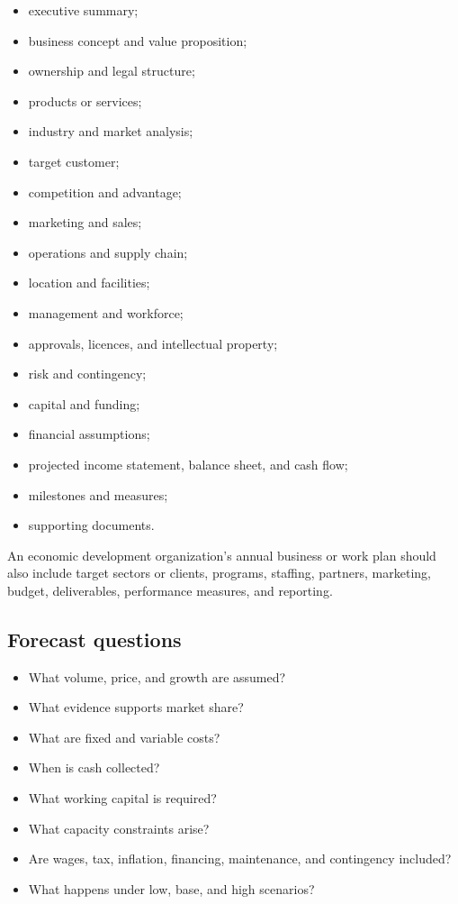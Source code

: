 \documentclass[11pt,letterpaper,oneside,openany]{book}
\begin{document}
\begin{itemize}
\item executive summary;
\item business concept and value proposition;
\item ownership and legal structure;
\item products or services;
\item industry and market analysis;
\item target customer;
\item competition and advantage;
\item marketing and sales;
\item operations and supply chain;
\item location and facilities;
\item management and workforce;
\item approvals, licences, and intellectual property;
\item risk and contingency;
\item capital and funding;
\item financial assumptions;
\item projected income statement, balance sheet, and cash flow;
\item milestones and measures;
\item supporting documents.
\end{itemize}


An economic development organization's annual business or work plan should also include target sectors or clients, programs, staffing, partners, marketing, budget, deliverables, performance measures, and reporting.


\subsection[Forecast questions]{Forecast questions}
\begin{itemize}
\item What volume, price, and growth are assumed?
\item What evidence supports market share?
\item What are fixed and variable costs?
\item When is cash collected?
\item What working capital is required?
\item What capacity constraints arise?
\item Are wages, tax, inflation, financing, maintenance, and contingency included?
\item What happens under low, base, and high scenarios?
\end{itemize}
\end{document}
